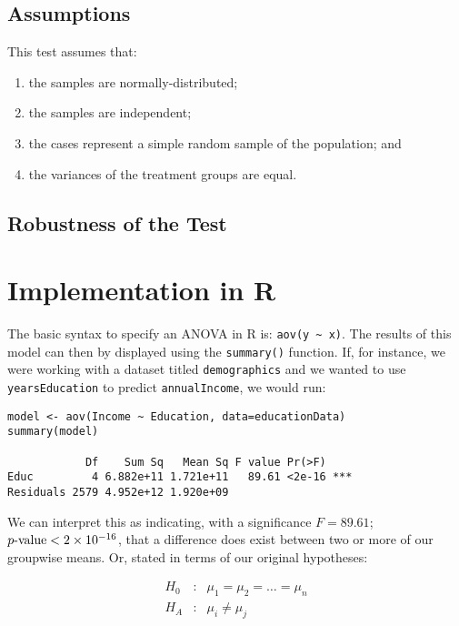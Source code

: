\subsection{Assumptions}

This test assumes that:

\begin{enumerate}
\item the samples are normally-distributed;
\item the samples are independent;
\item the cases represent a simple random sample of the population; and
\item the variances of the treatment groups are equal.
\end{enumerate}

\subsection{Robustness of the Test}

\section{Implementation in R}

The basic syntax to specify an ANOVA in R is: \verb|aov(y ~ x)|. The results of this model can then by displayed using the \verb|summary()| function. If, for instance, we were working with a dataset titled \verb|demographics| and we wanted to use \verb|yearsEducation| to predict \verb|annualIncome|, we would run:

\begin{framed}
\begin{Verbatim}[samepage=TRUE, commandchars=\\\{\}]
model <- aov(Income ~ Education, data=educationData)
summary(model)

            Df    Sum Sq   Mean Sq F value Pr(>F)    
Educ         4 6.882e+11 1.721e+11   89.61 <2e-16 ***
Residuals 2579 4.952e+12 1.920e+09 
\end{Verbatim}
\end{framed}

We can interpret this as indicating, with a significance $F = 89.61$; $p\text{-value}<2\times 10^{-16}$, that a difference does exist between two or more of our groupwise means. Or, stated in terms of our original hypotheses:

\begin{eqnarray*}
H_{0}&:& \mu_{1} = \mu_{2} = \ldots = \mu_{n} \\
H_{A}&:& \mu_{i} \neq \mu_{j}
\end{eqnarray*}

